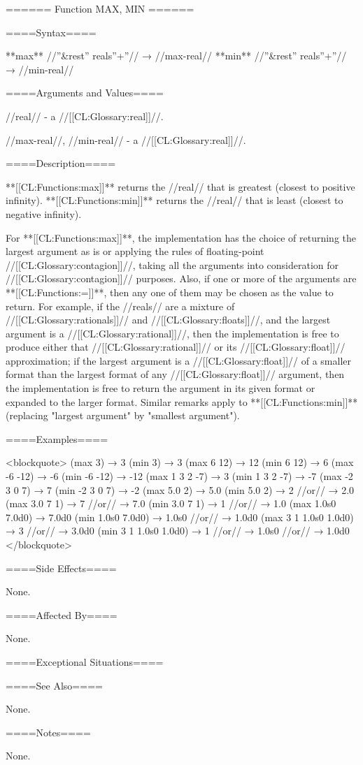 ====== Function MAX, MIN ======

====Syntax====

**max** //''&rest'' reals''+''// → //max-real// **min** //''&rest'' reals''+''// → //min-real//

====Arguments and Values====

//real// - a //[[CL:Glossary:real]]//.

//max-real//, //min-real// - a //[[CL:Glossary:real]]//.

====Description====

**[[CL:Functions:max]]** returns the //real// that is greatest (closest to positive infinity). **[[CL:Functions:min]]** returns the //real// that is least (closest to negative infinity).

For **[[CL:Functions:max]]**, the implementation has the choice of returning the largest argument as is or applying the rules of floating-point //[[CL:Glossary:contagion]]//, taking all the arguments into consideration for //[[CL:Glossary:contagion]]// purposes. Also, if one or more of the arguments are **[[CL:Functions:=]]**, then any one of them may be chosen as the value to return. For example, if the //reals// are a mixture of //[[CL:Glossary:rationals]]// and //[[CL:Glossary:floats]]//, and the largest argument is a //[[CL:Glossary:rational]]//, then the implementation is free to produce either that //[[CL:Glossary:rational]]// or its //[[CL:Glossary:float]]// approximation; if the largest argument is a //[[CL:Glossary:float]]// of a smaller format than the largest format of any //[[CL:Glossary:float]]// argument, then the implementation is free to return the argument in its given format or expanded to the larger format. Similar remarks apply to **[[CL:Functions:min]]** (replacing "largest argument" by "smallest argument").

====Examples====

<blockquote> (max 3) → 3 (min 3) → 3 (max 6 12) → 12 (min 6 12) → 6 (max -6 -12) → -6 (min -6 -12) → -12 (max 1 3 2 -7) → 3 (min 1 3 2 -7) → -7 (max -2 3 0 7) → 7 (min -2 3 0 7) → -2 (max 5.0 2) → 5.0 (min 5.0 2) → 2 //or// → 2.0 (max 3.0 7 1) → 7 //or// → 7.0 (min 3.0 7 1) → 1 //or// → 1.0 (max 1.0s0 7.0d0) → 7.0d0 (min 1.0s0 7.0d0) → 1.0s0 //or// → 1.0d0 (max 3 1 1.0s0 1.0d0) → 3 //or// → 3.0d0 (min 3 1 1.0s0 1.0d0) → 1 //or// → 1.0s0 //or// → 1.0d0 </blockquote>

====Side Effects====

None.

====Affected By====

None.

====Exceptional Situations====


====See Also====

None.

====Notes====

None.



